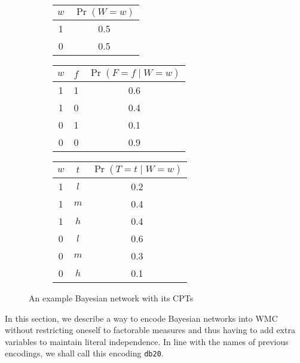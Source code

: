 \documentclass{article}
\theoremstyle{definition}
\theoremstyle{remark}
\begin{document}
{\begin{figure}
  \centering
  \begin{subfigure}{0.2\textwidth}
    \centering
  \end{subfigure}%
  \begin{subfigure}{0.8\textwidth}
    \centering
    \begin{tabular}[t]{cc}
      \toprule
      $w$ & $\Pr(W = w)$ \\
      \midrule
      1 & 0.5 \\
      0 & 0.5 \\
      \bottomrule
    \end{tabular}
    \begin{tabular}[t]{ccc}
      \toprule
      $w$ & $f$ & $\Pr(F = f \mid W = w)$ \\
      \midrule
      1 & 1 & 0.6 \\
      1 & 0 & 0.4 \\
      0 & 1 & 0.1 \\
      0 & 0 & 0.9 \\
      \bottomrule
    \end{tabular}
    \begin{tabular}[t]{ccc}
      \toprule
      $w$ & $t$ & $\Pr(T = t \mid W = w)$ \\
      \midrule
      1 & $l$ & 0.2 \\
      1 & $m$ & 0.4 \\
      1 & $h$ & 0.4 \\
      0 & $l$ & 0.6 \\
      0 & $m$ & 0.3 \\
      0 & $h$ & 0.1 \\
      \bottomrule
    \end{tabular}
  \end{subfigure}
  \caption{An example Bayesian network with its CPTs}
  \label{fig:example_bn}
\end{figure}

In this section, we describe a way to encode Bayesian networks into WMC without
restricting oneself to factorable measures and thus having to add extra
variables to maintain literal independence. In line with the names of previous
encodings, we shall call this encoding \texttt{db20}.

}
\end{document}
